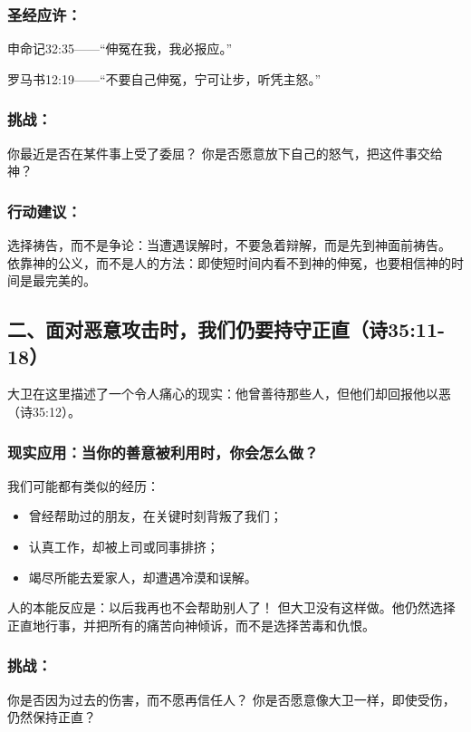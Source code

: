 \documentclass[a4paper, 12pt]{article}
\begin{document}
\subsubsection*{圣经应许：}

\hspace{0.6cm}申命记32:35——“伸冤在我，我必报应。”

罗马书12:19——“不要自己伸冤，宁可让步，听凭主怒。”

\subsubsection*{挑战：}
你最近是否在某件事上受了委屈？
你是否愿意放下自己的怒气，把这件事交给神？
\subsubsection*{行动建议：}

选择祷告，而不是争论：当遭遇误解时，不要急着辩解，而是先到神面前祷告。
依靠神的公义，而不是人的方法：即使短时间内看不到神的伸冤，也要相信神的时间是最完美的。
\subsection*{二、面对恶意攻击时，我们仍要持守正直（诗35:11-18）}

大卫在这里描述了一个令人痛心的现实：他曾善待那些人，但他们却回报他以恶（诗35:12）。

\subsubsection*{现实应用：当你的善意被利用时，你会怎么做？}
我们可能都有类似的经历：
\begin{itemize}
    \item 曾经帮助过的朋友，在关键时刻背叛了我们；

    \item 认真工作，却被上司或同事排挤；

    \item 竭尽所能去爱家人，却遭遇冷漠和误解。

\end{itemize}

人的本能反应是：以后我再也不会帮助别人了！ 但大卫没有这样做。他仍然选择正直地行事，并把所有的痛苦向神倾诉，而不是选择苦毒和仇恨。

\subsubsection*{挑战：}
你是否因为过去的伤害，而不愿再信任人？
你是否愿意像大卫一样，即使受伤，仍然保持正直？
\end{document}
